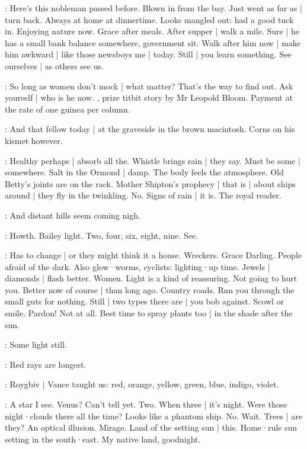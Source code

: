 \BloomCurrent:
Here's this nobleman passed before.
Blown in from the bay.
Just went as far as |
turn back.
Always at home at dinnertime.
Looks mangled out:
had a good tuck in.
Enjoying nature now.
Grace after meals.
After supper |
walk a mile.
Sure |
he has a small bank balance somewhere,
government sit.
Walk after him now |
make him awkward |
like those newsboys me |
today.
Still |
you learn something.
See ourselves |
as others see us.

\BloomAbstract:
So long as women don't mock |
what matter?
That's the way to find out.
Ask yourself |
who is he now.
,%
prize titbit story
by Mr Leopold Bloom.
Payment at the rate of one guinea per column.

\BloomToday:
And that fellow today |
at the graveside in the brown macintosh.
Corns on his kismet however.

\BloomAbstract:
Healthy perhaps |
absorb all the.
Whistle brings rain |
they say.
Must be some |
somewhere.
Salt in the Ormond |
damp.
The body feels the atmosphere.
Old Betty's joints are on the rack.
Mother Shipton's prophecy |
that is |
about ships around |
they fly in the twinkling.
No.
Signs of rain |
it is.
The royal reader.

\BloomCurrent:
And distant hills seem coming nigh.

\BloomCurrent:
Howth.
Bailey light.
Two,
four,
six,
eight,
nine.
See.

\BloomAbstract:
Has to change |
or they might think it a house.
Wreckers.
Grace Darling.
People afraid of the dark.
Also glow·worms,
cyclists:
lighting·up time.%
Jewels |
diamonds |
flash better.
Women.
Light is a kind of reassuring.
Not going to hurt you.
Better now of course |
than long ago.
Country roads.
Run you through the small guts for nothing.
Still |
two types there are |
you bob against.
Scowl or smile.
Pardon!
Not at all.
Best time to spray plants too |
in the shade after the sun.

\BloomCurrent:
Some light still.

\BloomAbstract:
Red rays are longest.

\BloomHist:
Roygbiv |
Vance taught us:
red,
orange,
yellow,
green,
blue,
indigo,
violet.

\BloomCurrent:
A star
I see.
Venus?
Can't tell yet.
Two.
When three |
it's night.
Were those night·clouds there all the time?
Looks like a phantom ship.
No.
Wait.
Trees |
are they?
An optical illusion.
Mirage.
Land of the setting sun |
this.
Home·rule sun setting in the south·east.
My native land,%
goodnight.

